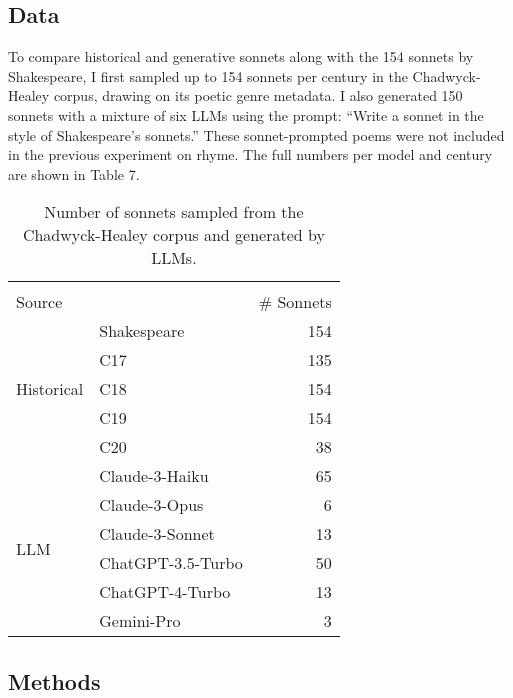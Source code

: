 \documentclass{simple-humanities}         %
\begin{document}
\subsection{Data}

To compare historical and generative sonnets along with the 154 sonnets by Shakespeare, I first sampled up to 154 sonnets per century in the Chadwyck-Healey corpus, drawing on its poetic genre metadata. I also generated 150 sonnets with a mixture of six LLMs using the prompt: ``Write a sonnet in the style of Shakespeare's sonnets.'' These sonnet-prompted poems were not included in the previous experiment on rhyme.
The full numbers per model and century are shown in Table 7.

\begin{table}[H]
  \centering
  \small
  \singlespacing
  \begin{tabular}{llr}
    \toprule
     &  &  \\
    Source &  & \# Sonnets  \\
    \midrule
    \multirow[t]{5}{*}{Historical} 
    & Shakespeare & 154 \\
    & C17 & 135 \\
     & C18 & 154 \\
     & C19 & 154 \\
     & C20 & 38 \\
    \midrule
    \multirow[t]{6}{*}{LLM} & Claude-3-Haiku & 65 \\
    & Claude-3-Opus & 6 \\
    & Claude-3-Sonnet & 13 \\
    & ChatGPT-3.5-Turbo & 50 \\
    & ChatGPT-4-Turbo & 13 \\
    & Gemini-Pro & 3 \\
    \bottomrule
    \end{tabular}
  \caption{Number of sonnets sampled from the Chadwyck-Healey corpus and generated by LLMs.}
  \label{tab:num_sonnets_corpus}
  \end{table}

\subsection{Methods}
\end{document}
